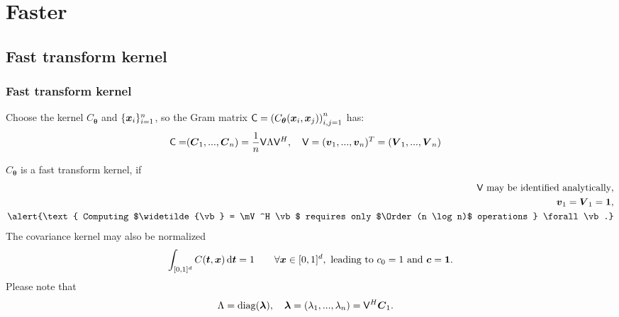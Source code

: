 \documentclass[handout, 10pt,compress,xcolor={usenames,dvipsnames}]{beamer} %
\newcommand{\bm}[1]{\boldsymbol{#1}}
\renewcommand{\mLambda}{\Lambda}
\newcommand{\vC}{\bvec{C}}
\newcommand{\D}[1]{\text{d}{#1}}
\renewcommand{\vtheta}{{\bm{\theta}}}
\newcommand{\pause}{}
\begin{document}
\section{Faster}



\subsection{Fast transform kernel}



\begin{frame}
\frametitle{Fast transform kernel}
\vspace{-4ex}
Choose the kernel $C_{\vtheta}$ and $\{\boldsymbol{x}_i\}_{i=1}^n$, so the Gram matrix $\mC =  \left( C_{\vtheta} (\vx_i,\vx_j) \right)_{i,j=1}^n$ has:
\vspace{-2ex}
\begin{align*}
\mC =& (\vC_1,...,\vC_n)
=  \frac 1n \mV \mLambda \mV^H, \quad
\mV = (\vv_1,...,\vv_n)^T = (\vV_1,...,\vV_n)
\end{align*}
\pause 
\vspace{-2ex}
$C_{\vtheta}$ is a fast transform kernel, if 
\begin{subequations} \label{fastcompAssump}
	\begin{align}
	\label{fastcompAssumpA}
	\mV \text{ may be identified analytically}, \\
	\label{fastcompAssumpB}
	\vv_1 = \vV_1 = \vone, \\
	\label{fastcompAssumpC}
	\alert{\text{ Computing $\widetilde{\vb} = \mV^H \vb$ requires only $\Order(n \log n)$ operations } \forall \vb.}
	\end{align}
\end{subequations}
\vspace{-1.5ex}
The covariance kernel may also be normalized 
\begin{align}
\label{addAssump}
\int_{[0,1]^d} C(\vt,\vx) \, \D \vt = 1 \qquad \forall \vx \in [0,1]^d,
\text{ leading to $c_0 = 1$ and $\vc = \vone$}.
\end{align}
Please note that
\begin{align*}
\mLambda &= \diag (\vlambda), \quad \vlambda = (\lambda_1,...,\lambda_n) = \mV^H \vC_1.
\end{align*}

\end{frame}
\end{document}
